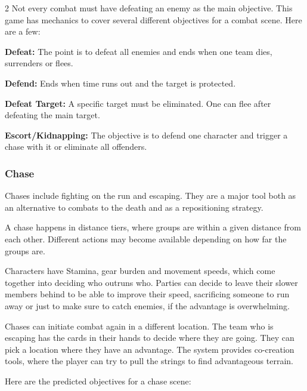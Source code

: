 \begin{multicols}{2}
Not every combat must have defeating an enemy as the main objective. This game has mechanics to cover several different objectives for a combat scene. Here are a few:

\begin{proplist}
  \item \textbf{Defeat:} The point is to defeat all enemies and ends when one team dies, surrenders or flees.
  \item \textbf{Defend:} Ends when time runs out and the target is protected.
  \item \textbf{Defeat Target:} A specific target must be eliminated. One can flee after defeating the main target.
  \item \textbf{Escort/Kidnapping:} The objective is to defend one character and trigger a chase with it or eliminate all offenders.
\end{proplist}

\subsubsection{Chase}

Chases include fighting on the run and escaping. They are a major tool both as an alternative to combats to the death and as a repositioning strategy. 

A chase happens in distance tiers, where groups are within a given distance from each other. Different actions may become available depending on how far the groups are.

Characters have Stamina, gear burden and movement speeds, which come together into deciding who outruns who. Parties can decide to leave their slower members behind to be able to improve their speed, sacrificing someone to run away or just to make sure to catch enemies, if the advantage is overwhelming.

Chases can initiate combat again in a different location. The team who is escaping has the cards in their hands to decide where they are going. They can pick a location where they have an advantage. The system provides co-creation tools, where the player can try to pull the strings to find advantageous terrain.

Here are the predicted objectives for a chase scene:


\end{multicols}
